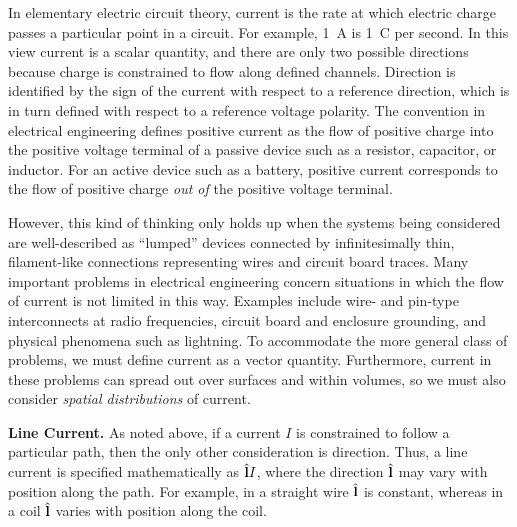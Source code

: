 

\label{m0101_Current_Distributions} %

In elementary electric circuit theory, current is the rate at which electric charge passes a particular point in a circuit. For example, 1~A is 1~C per second.
In this view current is a scalar quantity, and there are only two possible directions because charge is constrained to flow along defined channels.
Direction is identified by the sign of the current with respect to a reference direction, which is in turn defined with respect to a reference voltage polarity.
The convention in electrical engineering defines positive current as the flow of positive charge into the positive voltage terminal of a passive device such as a resistor, capacitor, or inductor.
For an active device such as a battery, positive current corresponds to the flow of positive charge \emph{out of} the positive voltage terminal.

However, this kind of thinking only holds up when the systems being considered are well-described as ``lumped'' devices connected by infinitesimally thin, filament-like connections representing wires and circuit board traces.
Many important problems in electrical engineering concern situations in which the flow of current is not limited in this way. Examples include wire- and pin-type interconnects at radio frequencies, circuit board and enclosure grounding, and physical phenomena such as lightning.
To accommodate the more general class of problems, we must define current as a vector quantity.
Furthermore, current in these problems can spread out over surfaces and within volumes, so we must also consider \emph{spatial distributions} of current.  

{\bf Line Current.}
As noted above, if a current $I$ is constrained to follow a particular path, then the only other consideration is direction.  Thus, a line current is specified mathematically as $\hat{\bf l}I$, where the direction $\hat{\bf l}$ may vary with position along the path.
For example, in a straight wire $\hat{\bf l}$ is constant, whereas in a coil $\hat{\bf l}$ varies with position along the coil.


